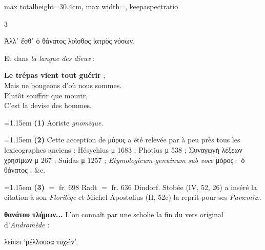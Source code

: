 \documentclass[11pt,twoside]{book}
\newcommand{\italique}[1]{\textit{#1}}
\newcommand{\citComm}[1]{\begin{quoting}[vskip=0.4pt,leftmargin=0.7em,rightmargin=0.2em]#1\end{quoting}}
\newcommand{\latin}[1]{\textit{#1}}
\begin{document}
\begin{adjustbox}{max totalheight=30.4cm, max width=\textwidth, keepaspectratio}
\begin{minipage}{\textwidth}
{\begin{multicols}{3}
\citComm{Ἀλλ᾽ ἔσθ᾽ ὁ θάνατος λοῖσθος ἰατρὸς νόσων.}
\par\vspace{1.5pt}
\noindent Et dans \italique{la langue des dieux} :
\citComm{\textbf{Le trépas vient tout guérir} ;\\
Mais ne bougeons d'où nous sommes.\\
Plutôt souffrir que mourir,\\
C'est la devise des hommes.}
\par\vspace{1.5pt}
\par\vspace{1.2pt}\par\nopagebreak\vspace{1pt}\noindent\hangindent=1.15em {\color{sepiaNote}\textbf{(1)}} Aoriste \italique{gnomique}.
\par\vspace{1.5pt}
\noindent\hangindent=1.15em {\color{sepiaNote}\textbf{(2)}} Cette acception de μόρος a été relevée par à peu près tous les lexicographes anciens : Hésychius μ 1683 ; Photius μ 538 ; Συναγωγὴ λέξεων χρησίμων μ 267 ; Suidas μ 1257 ; \latin{Etymologicum genuinum} \italique{sub voce} μόρος· ὁ θάνατος ; \&c.
\par\vspace{1.5pt}
\noindent\hangindent=1.15em {\color{sepiaNote}\textbf{(3)}} $=$ fr. 698 Radt $=$ fr. 636 Dindorf. Stobée (IV, 52, 26) a inséré la citation à son \italique{Florilège} et Michel Apostolius (II, 52c) la reprit pour ses \italique{Parœmiæ}.
\par\vspace{1.5pt}
 \textbf{θανάτου τλήμων...} L'on connaît par une scholie la fin du vers original d'\italique{Andromède} :
\citComm{λείπει `μέλλουσα τυχεῖν'.}
\par\vspace{1.5pt}

\end{multicols}}
\end{minipage}
\end{adjustbox}
\end{document}
